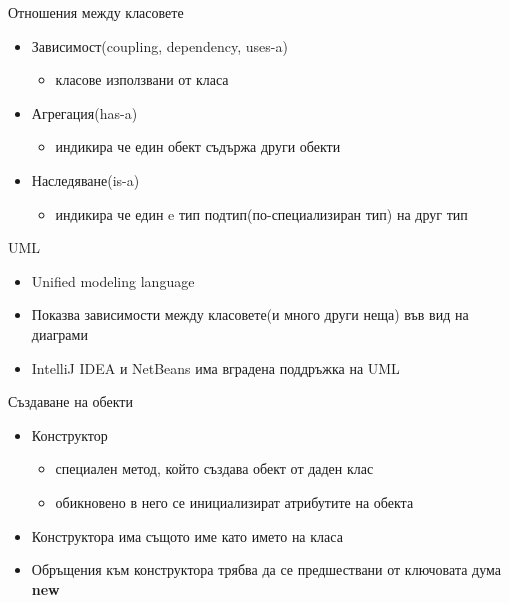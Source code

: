 \documentclass{beamer}
\begin{document}
\begin{frame}{Отношения между класовете}
  \transdissolve
  \begin{itemize}
  \item Зависимост(coupling, dependency, uses-a)
    \begin{itemize}
    \item класове използвани от класа
    \end{itemize}
  \item Агрегация(has-a)
    \begin{itemize}
    \item индикира че един обект съдържа други обекти
    \end{itemize}
  \item Наследяване(is-a)
    \begin{itemize}
    \item индикира че един e тип подтип(по-специализиран тип) на друг тип
    \end{itemize}
  \end{itemize}
\end{frame}

\begin{frame}{UML}
  \transdissolve
  \begin{itemize}
  \item Unified modeling language
  \item Показва зависимости между класовете(и
    много други неща) във вид на диаграми
  \item IntelliJ IDEA и NetBeans има вградена поддръжка на UML
  \end{itemize}
\end{frame}

\begin{frame}{Създаване на обекти}
  \transdissolve
  \begin{itemize}
  \item Конструктор
    \begin{itemize}
    \item специален метод, който създава обект от даден клас
    \item обикновено в него се инициализират атрибутите на обекта
    \end{itemize}
  \item Конструктора има същото име като
    името на класа
  \item Обръщения към конструктора трябва да
    се предшествани от ключовата дума
    \textbf{new}
  \end{itemize}
\end{frame}
\end{document}
